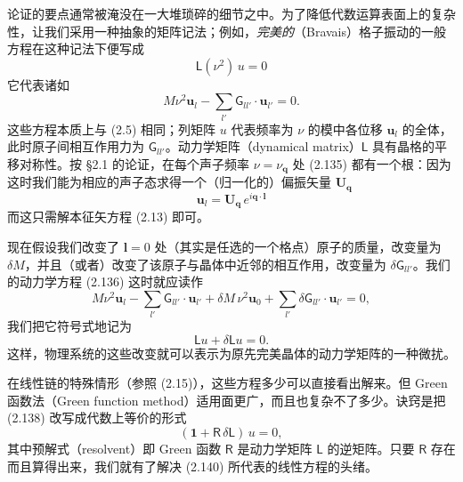 论证的要点通常被淹没在一大堆琐碎的细节之中。为了降低代数运算表面上的复杂性，让我们采用一种抽象的矩阵记法；例如，\emph{完美的}（Bravais）格子振动的一般方程在这种记法下便写成
\begin{equation*}
\mathsf{L}(\nu^2)\,u=0
\tag{2.135}
\end{equation*}
它代表诸如
\begin{equation*}
M\nu^2\mathbf{u}_l-\sum_{l'}\mathsf{G}_{ll'}\cdot\mathbf{u}_{l'}=0.
\tag{2.136}
\end{equation*}
这些方程本质上与 (2.5) 相同；列矩阵 $u$ 代表频率为 $\nu$ 的模中各位移 $\mathbf{u}_l$ 的全体，此时原子间相互作用力为 $\mathsf{G}_{ll'}$。动力学矩阵（dynamical matrix）$\mathsf{L}$ 具有晶格的平移对称性。按 §2.1 的论证，在每个声子频率 $\nu=\nu_{\mathbf{q}}$ 处 (2.135) 都有一个根：因为这时我们能为相应的声子态求得一个（归一化的）偏振矢量 $\mathbf{U}_{\mathbf{q}}$
\begin{equation*}
\mathbf{u}_l=\mathbf{U}_{\mathbf{q}}\,e^{i\mathbf{q}\cdot\mathbf{l}}
\tag{2.137}
\end{equation*}
而这只需解本征矢方程 (2.13) 即可。

现在假设我们改变了 $\mathbf{l}=0$ 处（其实是任选的一个格点）原子的质量，改变量为 $\delta M$，并且（或者）改变了该原子与晶体中近邻的相互作用，改变量为 $\delta\mathsf{G}_{ll'}$。我们的动力学方程 (2.136) 这时就应读作
\begin{equation*}
M\nu^2\mathbf{u}_l-\sum_{l'}\mathsf{G}_{ll'}\cdot\mathbf{u}_{l'}+\delta M\,\nu^2\mathbf{u}_0+\sum_{l'}\delta\mathsf{G}_{ll'}\cdot\mathbf{u}_{l'}=0,
\tag{2.138}
\end{equation*}
我们把它符号式地记为
\begin{equation*}
\mathsf{L}u+\delta\mathsf{L}u=0.
\tag{2.139}
\end{equation*}
这样，物理系统的这些改变就可以表示为原先完美晶体的动力学矩阵的一种微扰。

在线性链的特殊情形（参照 (2.15)），这些方程多少可以直接看出解来。但 Green 函数法（Green function method）适用面更广，而且也复杂不了多少。诀窍是把 (2.138) 改写成代数上等价的形式
\begin{equation*}
(\mathbf{1}+\mathsf{R}\,\delta\mathsf{L})\,u=0,
\tag{2.140}
\end{equation*}
其中预解式（resolvent）即 Green 函数 $\mathsf{R}$ 是动力学矩阵 $\mathsf{L}$ 的逆矩阵。只要 $\mathsf{R}$ 存在而且算得出来，我们就有了解决 (2.140) 所代表的线性方程的头绪。

